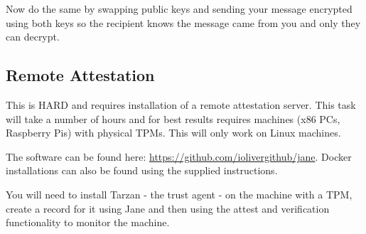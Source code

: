 \documentclass[11pt,a4paper]{article}
\begin{document}
Now do the same by swapping public keys and sending your message encrypted using both keys so the recipient knows the message came from you and only they can decrypt.

\subsection{Remote Attestation}
This is HARD and requires installation of a remote attestation server. This task will take a number of hours and for best results requires machines (x86 PCs, Raspberry Pis) with physical TPMs. This will only work on Linux machines.

The software can be found here: \url{https://github.com/iolivergithub/jane}. Docker installations can also be found using the supplied instructions.

You will need to install Tarzan - the trust agent - on the machine with a TPM, create a record for it using Jane and then using the attest and verification functionality to monitor the machine.
\end{document}
